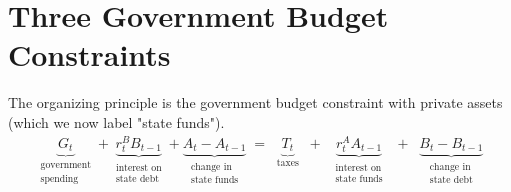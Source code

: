\documentclass[11pt]{article}
\begin{document}
\section{Three Government Budget Constraints}

The organizing principle is the government budget constraint with private assets (which we now label "state funds").  
\begin{eqnarray}
\underbrace{G_t}_{\substack{\text{government}\\\text{spending}}}  + \underbrace{r_t^B B_{t-1}}_{\substack{\text{interest on}\\\text{state debt}}} + \underbrace{A_t - A_{t-1}}_{\substack{\text{change in}\\ \text{state funds}}} \; = \; \; \underbrace{T_t}_{\text{taxes}}
\; \; + \; \; \underbrace{r_t^A A_{t-1}}_{\substack{\text{interest on}\\ \text{state funds}}}  \; \;  +  \; \; \underbrace{B_t - B_{t-1}}_{\substack{\text{change in}\\ \text{state debt}}} 
\label{eq:nys_consolidated_bc}
\end{eqnarray}
\end{document}
